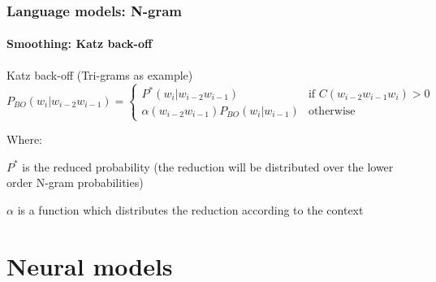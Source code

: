 \documentclass[xcolor=table]{beamer}
\begin{document}
\begin{frame}
\frametitle{Language models: N-gram}
\framesubtitle{Smoothing: Katz back-off}

\begin{block}{Katz back-off (Tri-grams as example)}
	\[%
	P_{BO}(w_i | w_{i-2} w_{i-1}) = 
	\begin{cases}
	P^*(w_i | w_{i-2} w_{i-1}) & \text{if } C(w_{i-2} w_{i-1} w_i) > 0 \\
	\alpha(w_{i-2} w_{i-1}) P_{BO}(w_i | w_{i-1}) & \text{otherwise}
	\end{cases}
	\]
	
	Where: 
	
	$P^*$ is the reduced probability (the reduction will be distributed over the lower order N-gram probabilities)
	
	$\alpha$ is a function which distributes the reduction according to the context
\end{block}


\end{frame}


\section{Neural models}

%
%
\end{document}
